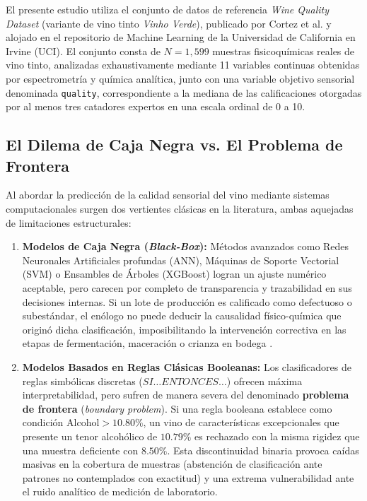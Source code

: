 \documentclass{article}
\begin{document}
El presente estudio utiliza el conjunto de datos de referencia \textit{Wine Quality Dataset} (variante de vino tinto \textit{Vinho Verde}), publicado por Cortez et al. \cite{cortez2009modeling} y alojado en el repositorio de Machine Learning de la Universidad de California en Irvine (UCI). El conjunto consta de $N = 1,599$ muestras fisicoquímicas reales de vino tinto, analizadas exhaustivamente mediante 11 variables continuas obtenidas por espectrometría y química analítica, junto con una variable objetivo sensorial denominada \texttt{quality}, correspondiente a la mediana de las calificaciones otorgadas por al menos tres catadores expertos en una escala ordinal de 0 a 10.

\subsection{El Dilema de Caja Negra vs. El Problema de Frontera}

Al abordar la predicción de la calidad sensorial del vino mediante sistemas computacionales surgen dos vertientes clásicas en la literatura, ambas aquejadas de limitaciones estructurales:
\begin{enumerate}
    \item \textbf{Modelos de Caja Negra (\textit{Black-Box}):} Métodos avanzados como Redes Neuronales Artificiales profundas (ANN), Máquinas de Soporte Vectorial (SVM) o Ensambles de Árboles (XGBoost) logran un ajuste numérico aceptable, pero carecen por completo de transparencia y trazabilidad en sus decisiones internas. Si un lote de producción es calificado como defectuoso o subestándar, el enólogo no puede deducir la causalidad físico-química que originó dicha clasificación, imposibilitando la intervención correctiva en las etapas de fermentación, maceración o crianza en bodega \cite{cortez2009modeling}.
    \item \textbf{Modelos Basados en Reglas Clásicas Booleanas:} Los clasificadores de reglas simbólicas discretas ($SI \dots ENTONCES \dots$) ofrecen máxima interpretabilidad, pero sufren de manera severa del denominado \textbf{problema de frontera} (\textit{boundary problem}). Si una regla booleana establece como condición $\text{Alcohol} > 10.80\%$, un vino de características excepcionales que presente un tenor alcohólico de $10.79\%$ es rechazado con la misma rigidez que una muestra deficiente con $8.50\%$. Esta discontinuidad binaria provoca caídas masivas en la cobertura de muestras (abstención de clasificación ante patrones no contemplados con exactitud) y una extrema vulnerabilidad ante el ruido analítico de medición de laboratorio.
\end{enumerate}
\end{document}
